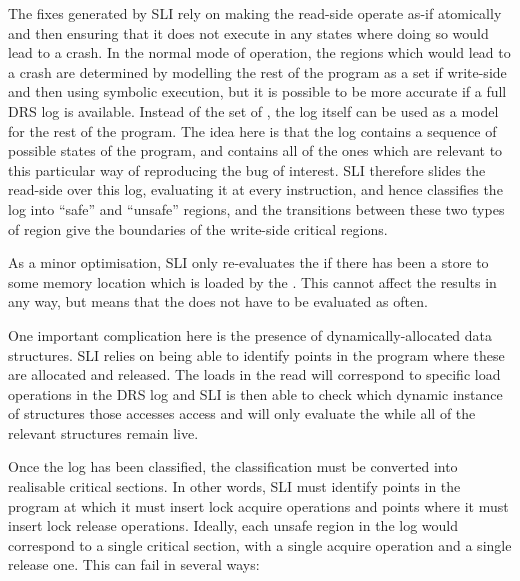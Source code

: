 The fixes generated by SLI rely on making the read-side \StateMachine operate as-if atomically and then ensuring that it does not execute in any states where doing so would lead to a crash.
In the normal mode of operation, the regions which would lead to a crash are determined by modelling the rest of the program as a set if write-side \StateMachines and then using symbolic execution, but it is possible to be more accurate if a full DRS log is available.
Instead of the set of \StateMachines, the log itself can be used as a model for the rest of the program.
The idea here is that the log contains a sequence of possible states of the program, and contains all of the ones which are relevant to this particular way of reproducing the bug of interest.
SLI therefore slides the read-side \StateMachine over this log, evaluating it at every instruction, and hence classifies the log into ``safe'' and ``unsafe'' regions, and the transitions between these two types of region give the boundaries of the write-side critical regions.

As a minor optimisation, SLI only re-evaluates the \StateMachine if there has been a store to some memory location which is loaded by the \StateMachine.
This cannot affect the results in any way, but means that the \StateMachine does not have to be evaluated as often.

One important complication here is the presence of dynamically-allocated data structures.
SLI relies on being able to identify points in the program where these are allocated and released.
The loads in the read \StateMachine will correspond to specific load operations in the DRS log and SLI is then able to check which dynamic instance of structures those accesses access and will only evaluate the \StateMachine while all of the relevant structures remain live.

Once the log has been classified, the classification must be converted into realisable critical sections.
In other words, SLI must identify points in the program at which it must insert lock acquire operations and points where it must insert lock release operations.
Ideally, each unsafe region in the log would correspond to a single critical section, with a single acquire operation and a single release one.
This can fail in several ways:

